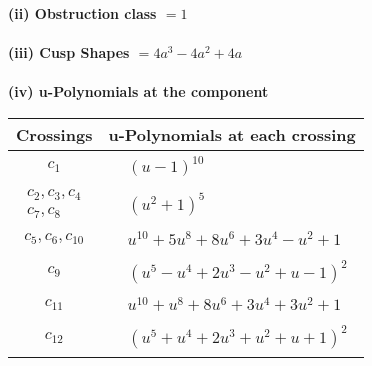 \documentclass[1p]{elsarticle_modified}
\theoremstyle{definition}
\begin{document}
\flushleft \textbf{(ii) Obstruction class $= 1$}\\~\\
\flushleft \textbf{(iii) Cusp Shapes $= 4 a^3-4 a^2+4 a$}\\~\\
\newpage\renewcommand{\arraystretch}{1}
\flushleft \textbf{(iv) u-Polynomials at the component}\newline \\
\begin{tabular}{m{50pt}|m{274pt}}
Crossings & \hspace{64pt}u-Polynomials at each crossing \\
\hline $$\begin{aligned}c_{1}\end{aligned}$$&$\begin{aligned}
&(u-1)^{10}
\end{aligned}$\\
\hline $$\begin{aligned}c_{2},c_{3},c_{4}\\c_{7},c_{8}\end{aligned}$$&$\begin{aligned}
&(u^2+1)^5
\end{aligned}$\\
\hline $$\begin{aligned}c_{5},c_{6},c_{10}\end{aligned}$$&$\begin{aligned}
&u^{10}+5 u^8+8 u^6+3 u^4- u^2+1
\end{aligned}$\\
\hline $$\begin{aligned}c_{9}\end{aligned}$$&$\begin{aligned}
&(u^5- u^4+2 u^3- u^2+u-1)^2
\end{aligned}$\\
\hline $$\begin{aligned}c_{11}\end{aligned}$$&$\begin{aligned}
&u^{10}+u^8+8 u^6+3 u^4+3 u^2+1
\end{aligned}$\\
\hline $$\begin{aligned}c_{12}\end{aligned}$$&$\begin{aligned}
&(u^5+u^4+2 u^3+u^2+u+1)^2
\end{aligned}$\\
\hline
\end{tabular}\\~\\
\end{document}

